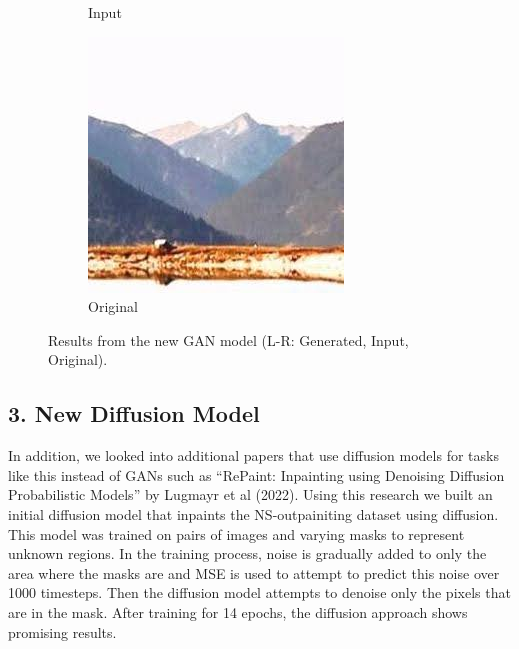 \documentclass[sigconf]{acmart}
\begin{document}
\begin{figure}[h]
\begin{subfigure}[b]{0.3\linewidth}
        \caption{Input}
    \end{subfigure}
    \hfill
    \begin{subfigure}[b]{0.3\linewidth}
        \includegraphics[width=\linewidth]{original3.jpg}
        \caption{Original}
    \end{subfigure}
    \caption{Results from the new GAN model (L-R: Generated, Input, Original).}
\end{figure}

\subsection*{3. New Diffusion Model}
In addition, we looked into additional papers that use diffusion models for tasks like this instead of GANs such as “RePaint: Inpainting using Denoising Diffusion Probabilistic Models” by Lugmayr et al (2022). Using this research we built an initial diffusion model that inpaints the NS-outpainiting dataset using diffusion. This model was trained on pairs of images and varying masks to represent unknown regions. In the training process, noise is gradually added to only the area where the masks are and MSE is used to attempt to predict this noise over 1000 timesteps. Then the diffusion model attempts to denoise only the pixels that are in the mask. After training for 14 epochs, the diffusion approach shows promising results.  
\end{document}
